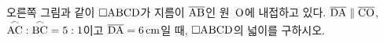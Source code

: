 \noindent\begin{minipage}[t]{0.58\linewidth}\vspace{0pt}\raggedright 오른쪽 그림과 같이 $\square\mathrm{ABCD}$가 지름이 $\overline{\mathrm{AB}}$인 원~$\mathrm{O}$에 내접하고 있다. $\overline{\mathrm{DA}}\parallel\overline{\mathrm{CO}}$, $\overset{\frown}{\mathrm{AC}}:\overset{\frown}{\mathrm{BC}}=5:1$이고 $\overline{\mathrm{DA}}=6\,\mathrm{cm}$일 때, $\square\mathrm{ABCD}$의 넓이를 구하시오.\end{minipage}\hfill\begin{minipage}[t]{0.4\linewidth}\vspace{0pt}\centering \resizebox{\ifdim\width>\linewidth\linewidth\else\width\fi}{!}{}\end{minipage}\par
